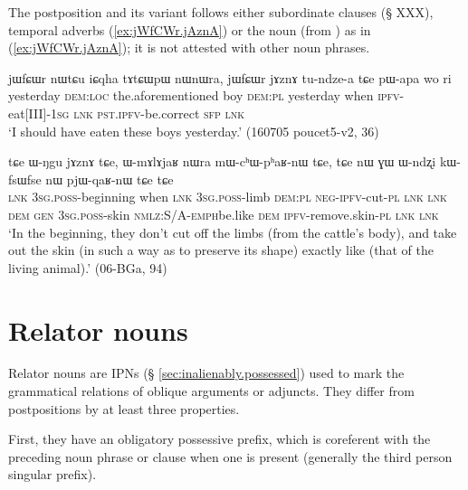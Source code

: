 The postposition  and its variant  follows either subordinate clauses (§ XXX), temporal adverbs (\ref{ex:jWfCWr.jAznA}) or the noun  (from ) as in (\ref{ex:jWfCWr.jAznA}); it is not attested with other noun phrases.

\begin{exe}
\ex \label{ex:jWfCWr.jAznA}
\gll  jɯfɕɯr nɯtɕu iɕqha tɤtɕɯpɯ nɯnɯra, jɯfɕɯr jɤznɤ tu-ndze-a tɕe pɯ-apa wo ri \\ 
yesterday \textsc{dem}:\textsc{loc} the.aforementioned boy \textsc{dem}:\textsc{pl} yesterday when \textsc{ipfv}-eat[III]-\textsc{1sg}  \textsc{lnk} \textsc{pst}.\textsc{ipfv}-be.correct \textsc{sfp} \textsc{lnk} \\
\glt  `I should have eaten these boys yesterday.' (160705 poucet5-v2, 36)
\end{exe}

 \begin{exe}
\ex \label{ex:WNgu.jAznA}
\gll  tɕe ɯ-ŋgu jɤznɤ tɕe, ɯ-mɤlɤjaʁ nɯra mɯ-cʰɯ-pʰaʁ-nɯ tɕe,  tɕe nɯ ɣɯ ɯ-ndʐi kɯ-fsɯ\redp{}fse nɯ pjɯ-qaʁ-nɯ tɕe tɕe \\
\textsc{lnk} \textsc{3sg}.\textsc{poss}-beginning when \textsc{lnk} \textsc{3sg}.\textsc{poss}-limb \textsc{dem}:\textsc{pl} \textsc{neg}-\textsc{ipfv}-cut-\textsc{pl} \textsc{lnk} \textsc{lnk} \textsc{dem} \textsc{gen} \textsc{3sg}.\textsc{poss}-skin \textsc{nmlz}:S/A-\textsc{emph}\redp{}be.like \textsc{dem} \textsc{ipfv}-remove.skin-\textsc{pl} \textsc{lnk} \textsc{lnk} \\
\glt `In the beginning, they don't cut off the limbs (from the cattle's body), and take out the skin (in such a way as to preserve its shape) exactly like (that of the living animal).' (06-BGa, 94)
\end{exe}


 
\section{Relator nouns}  \label{sec:relator.nouns}  
Relator nouns are IPNs (§ \ref{sec:inalienably.possessed}) used to mark the grammatical relations of oblique arguments or adjuncts. They differ from postpositions by at least three properties. 

First, they have an obligatory possessive prefix, which is coreferent with the preceding noun phrase or clause when one is present (generally the third person singular  prefix). 

